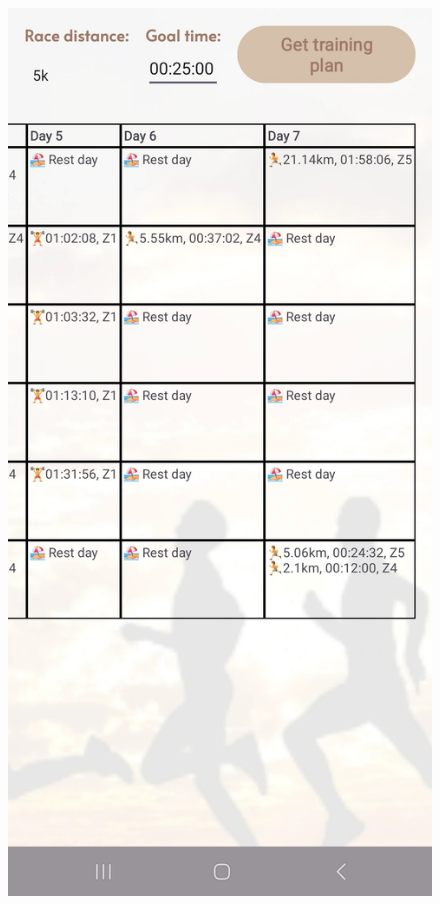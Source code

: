 \documentclass[12pt,oneside]{memoir}
\begin{document}
\begin{figure}[h]
\begin{minipage}{0.23\textwidth}
  \end{minipage}
  \hfill
  \begin{minipage}{0.23\textwidth}
    \centering
    \includegraphics[width=\textwidth]{assets/pictures/app_screenshots/training_plan_2.jpg}

\end{minipage}
\end{figure}
\end{document}
